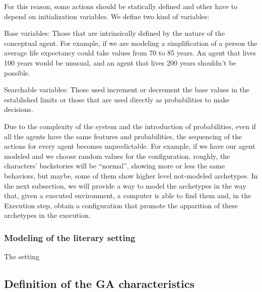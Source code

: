 \documentclass{sig-alternate}
\begin{document}
For this reason, some actions should be statically defined and other have to depend on initialization variables. We define two kind of variables:

\item{Base variables}: Those that are intrinsically defined by the nature of the conceptual agent. For example, if we are modeling a simplification of a person the average life expectancy could take values from 70 to 85 years. An agent that lives 100 years would be unusual, and an agent that lives 200 years shouldn't be possible.
\item{Searchable variables}: Those used increment or decrement the base values in the established limits or those that are used directly as probabilities to make decisions.


Due to the complexity of the system and the introduction of probabilities, even if all the agents have the same features and probabilities, the sequencing of the actions for every agent becomes unpredictable. For example, if we have our agent modeled and we choose random values for the configuration, roughly, the characters' backstories will be ``normal'', showing more or less the same behaviors, but maybe, some of them show higher level not-modeled archetypes. In the next subsection, we will provide a way to model the archetypes in the way that, given a executed environment, a computer is able to find them 
and, in the Execution step, obtain a configuration that promote the apparition of these archetypes in the execution.

\subsubsection{Modeling of the literary setting}

The setting 



\subsection{Definition of the GA characteristics}

\end{document}
